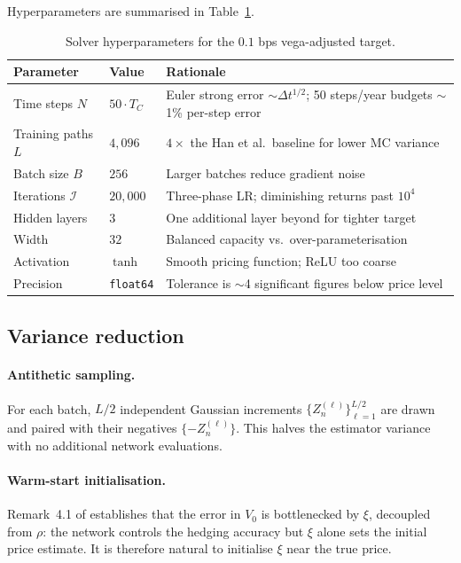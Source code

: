 \documentclass[11pt,a4paper]{article}
\begin{document}
Hyperparameters are summarised in Table~\ref{tab:hypers}.

\begin{table}[h]
\centering
\begin{tabular}{lll}
\toprule
Parameter & Value & Rationale \\
\midrule
Time steps $N$ & $50 \cdot T_C$ & Euler strong error $\sim \Delta t^{1/2}$; 50 steps/year budgets $\sim$1\% per-step error \\
Training paths $L$ & $4{,}096$ & $4\times$ the Han et al.\ baseline for lower MC variance \\
Batch size $B$ & $256$ & Larger batches reduce gradient noise \\
Iterations $\mathcal{I}$ & $20{,}000$ & Three-phase LR; diminishing returns past $10^4$ \\
Hidden layers & $3$ & One additional layer beyond \cite{HJE2018} for tighter target \\
Width & $32$ & Balanced capacity vs.\ over-parameterisation \\
Activation & $\tanh$ & Smooth pricing function; ReLU too coarse \\
Precision & \texttt{float64} & Tolerance is $\sim$4 significant figures below price level \\
\bottomrule
\end{tabular}
\caption{Solver hyperparameters for the $0.1$ bps vega-adjusted target.}
\label{tab:hypers}
\end{table}

\subsection{Variance reduction}

\paragraph{Antithetic sampling.}
For each batch, $L/2$ independent Gaussian increments $\{Z_n^{(\ell)}\}_{\ell=1}^{L/2}$
are drawn and paired with their negatives $\{-Z_n^{(\ell)}\}$. This halves
the estimator variance with no additional network evaluations.

\paragraph{Warm-start initialisation.}
Remark~4.1 of \cite{GPR2022} establishes that the error in $V_0$ is
bottlenecked by $\xi$, decoupled from $\rho$: the network controls the
hedging accuracy but $\xi$ alone sets the initial price estimate. It is
therefore natural to initialise $\xi$ near the true price.
\end{document}
